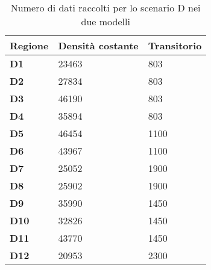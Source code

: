 \documentclass[a4paper, 12pt]{article}
\begin{document}
\begin{table}[h]
  \centering
  \resizebox{0.7\textwidth}{!} {
 \begin{tabular}[t]{ |l|l|l| }
	 	\hline
	\textbf{Regione}	&		\textbf{Densità costante}	&		\textbf{Transitorio}	\\ \hline
	\textbf{D1} 	 &		23463					&	803	\\ \hline
	\textbf{D2}		 &		27834 				&		803		\\ \hline
	\textbf{D3}		 &		46190 				&		803		\\ \hline
	\textbf{D4}		 &		35894 				&		803		\\ \hline
	\textbf{D5}		 &		46454 				&		1100		\\ \hline
	\textbf{D6}		 &		43967 				&		1100		\\ \hline
	\textbf{D7}		 &		25052 				&		1900		\\ \hline
	\textbf{D8}		 &		25902 				&		1900		\\ \hline
	\textbf{D9}		 &		35990 				&		1450		\\ \hline
	\textbf{D10}	 &		32826 				&		1450		\\ \hline
	\textbf{D11}	 &		43770 				&		1450		\\ \hline
	\textbf{D12}	 &		20953 				&		2300		\\ \hline
	
	
  \end{tabular}
  
  }
  \caption{Numero di dati raccolti per lo scenario D nei due modelli}
  \label{tab:tabella-dati-simulazioni-D}
\end{table}
\end{document}
